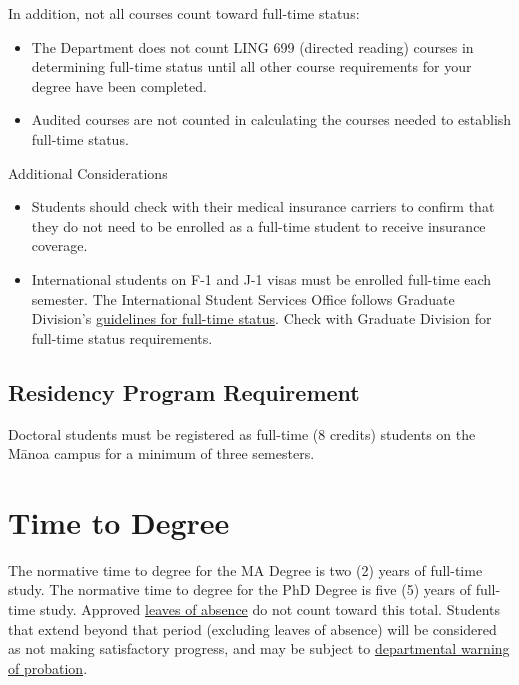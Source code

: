 \documentclass[
]{book}
\providecommand{\tightlist}{%
  \setlength{\itemsep}{0pt}\setlength{\parskip}{0pt}}
\begin{document}
In addition, not all courses count toward full-time status:

\begin{itemize}
\tightlist
\item
  The Department does not count LING 699 (directed reading) courses in determining full-time status until all other course requirements for your degree have been completed.
\item
  Audited courses are not counted in calculating the courses needed to establish full-time status.
\end{itemize}

Additional Considerations

\begin{itemize}
\tightlist
\item
  Students should check with their medical insurance carriers to confirm that they do not need to be enrolled as a full-time student to receive insurance coverage.
\item
  International students on F-1 and J-1 visas must be enrolled full-time each semester. The International Student Services Office follows Graduate Division's \href{https://manoa.hawaii.edu/graduate/course-loads-full-time-definition/}{guidelines for full-time status}. Check with Graduate Division for full-time status requirements.
\end{itemize}

\hypertarget{residency-program-requirement}{%
\subsection{Residency Program Requirement}\label{residency-program-requirement}}

Doctoral students must be registered as full-time (8 credits) students on the Mānoa campus for a minimum of three semesters.

\hypertarget{time}{%
\section{Time to Degree}\label{time}}

The normative time to degree for the MA Degree is two (2) years of full-time study.
The normative time to degree for the PhD Degree is five (5) years of full-time study.
Approved \href{leave}{leaves of absence} do not count toward this total.
Students that extend beyond that period (excluding leaves of absence) will be considered as not making satisfactory progress, and may be subject to \href{probation}{departmental warning of probation}.
\end{document}
